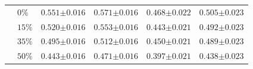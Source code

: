 \begin{table}[htp]
\begin{tabularx}{\textwidth}{ll|CCCC}
&$0\%$ & $0.551{\scriptstyle\pm0.016}$ & $0.571{\scriptstyle\pm0.016}$ & $0.468{\scriptstyle\pm0.022}$ & $0.505{\scriptstyle\pm0.023}$ \\
&$15\%$ & $0.520{\scriptstyle\pm0.016}$ & $0.553{\scriptstyle\pm0.016}$ & $0.443{\scriptstyle\pm0.021}$ & $0.492{\scriptstyle\pm0.023}$ \\
&$35\%$ & $0.495{\scriptstyle\pm0.016}$ & $0.512{\scriptstyle\pm0.016}$ & $0.450{\scriptstyle\pm0.021}$ & $0.489{\scriptstyle\pm0.023}$ \\
&$50\%$ & $0.443{\scriptstyle\pm0.016}$ & $0.471{\scriptstyle\pm0.016}$ & $0.397{\scriptstyle\pm0.021}$ & $0.438{\scriptstyle\pm0.023}$ \\
\bottomrule
\end{tabularx}
\end{table}
